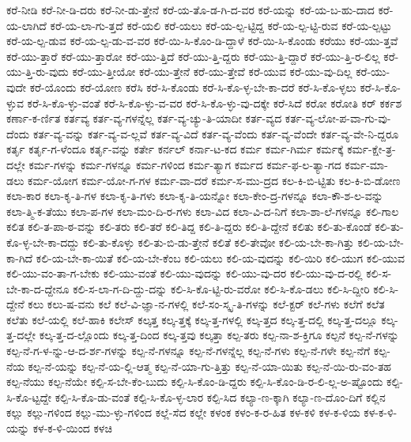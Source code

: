 {ಕರೆ-ನೀಡಿ
ಕರೆ-ನೀ-ಡಿ-ದರು
ಕರೆ-ನೀ-ಡು-ತ್ತೇನೆ
ಕರೆ-ಯ-ತೊ-ಡ-ಗಿ-ದ-ವರ
ಕರೆ-ಯನ್ನು
ಕರೆ-ಯ-ಬ-ಹು-ದಾದ
ಕರೆ-ಯ-ಲಾಗಿದೆ
ಕರೆ-ಯ-ಲಾ-ಗು-ತ್ತದೆ
ಕರೆ-ಯಲಿ
ಕರೆ-ಯಲು
ಕರೆ-ಯ-ಲ್ಪ-ಟ್ಟಿದ್ದ
ಕರೆ-ಯ-ಲ್ಪ-ಟ್ಟಿ-ರುವ
ಕರೆ-ಯ-ಲ್ಪಟ್ಟು
ಕರೆ-ಯ-ಲ್ಪ-ಡುವ
ಕರೆ-ಯ-ಲ್ಪ-ಡು-ವ-ವರ
ಕರೆ-ಯಿ-ಸಿ-ಕೊಂ-ಡಿ-ದ್ದಾಳೆ
ಕರೆ-ಯಿ-ಸಿ-ಕೊಂಡು
ಕರೆಯು
ಕರೆ-ಯು-ತ್ತವೆ
ಕರೆ-ಯು-ತ್ತಾರೆ
ಕರೆ-ಯು-ತ್ತಾರೋ
ಕರೆ-ಯು-ತ್ತಿದೆ
ಕರೆ-ಯು-ತ್ತಿ-ದ್ದರು
ಕರೆ-ಯು-ತ್ತಿ-ದ್ದಾರೆ
ಕರೆ-ಯು-ತ್ತಿ-ರ-ಲಿಲ್ಲ
ಕರೆ-ಯು-ತ್ತಿ-ರು-ವುದು
ಕರೆ-ಯು-ತ್ತೀಯೋ
ಕರೆ-ಯು-ತ್ತೇನೆ
ಕರೆ-ಯು-ತ್ತೇವೆ
ಕರೆ-ಯುವ
ಕರೆ-ಯು-ವು-ದಿಲ್ಲ
ಕರೆ-ಯು-ವುದೇ
ಕರೆ-ಯೊಂದು
ಕರೆ-ಯೋಣ
ಕರೆಸಿ
ಕರೆ-ಸಿ-ಕೊಂಡು
ಕರೆ-ಸಿ-ಕೊ-ಳ್ಳ-ಬೇ-ಕಾ-ದರೆ
ಕರೆ-ಸಿ-ಕೊ-ಳ್ಳಲು
ಕರೆ-ಸಿ-ಕೊ-ಳ್ಳುವ
ಕರೆ-ಸಿ-ಕೊ-ಳ್ಳು-ವಂತೆ
ಕರೆ-ಸಿ-ಕೊ-ಳ್ಳು-ವ-ವರ
ಕರೆ-ಸಿ-ಕೊ-ಳ್ಳು-ವು-ದಕ್ಕೇ
ಕರೆ-ಸಿದೆ
ಕರೋ
ಕರೋತಿ
ಕರ್
ಕರ್ಕಶ
ಕರ್ಣಾ-ಕ-ರ್ಣಿತ
ಕರ್ತವ್ಯ
ಕರ್ತ-ವ್ಯ-ಗಳನ್ನೆಲ್ಲ
ಕರ್ತ-ವ್ಯ-ಚ್ಯು-ತಿ-ಯಾದೀ
ಕರ್ತ-ವ್ಯದ
ಕರ್ತ-ವ್ಯ-ಲೋ-ಪ-ವಾ-ಗು-ವು-ದೆಂದು
ಕರ್ತ-ವ್ಯ-ವನ್ನು
ಕರ್ತ-ವ್ಯ-ವ-ಲ್ಲವೆ
ಕರ್ತ-ವ್ಯ-ವಿದೆ
ಕರ್ತ-ವ್ಯ-ವೆಂದು
ಕರ್ತ-ವ್ಯ-ವೆಂದೇ
ಕರ್ತ-ವ್ಯ-ವೇ-ನಿ-ದ್ದರೂ
ಕರ್ತೃ
ಕರ್ತೃ-ಗ-ಳೆಂದೂ
ಕರ್ತೃ-ವನ್ನು
ಕರ್ತೇ
ಕರ್ನಲ್
ಕರ್ನಾ-ಟ-ಕದ
ಕರ್ಮ
ಕರ್ಮ-ಗಿರ್ಮ
ಕರ್ಮಕ್ಕೆ
ಕರ್ಮ-ಕ್ಷೇ-ತ್ರ-ದಲ್ಲೇ
ಕರ್ಮ-ಗಳನ್ನು
ಕರ್ಮ-ಗಳನ್ನೂ
ಕರ್ಮ-ಗಳಿಂದ
ಕರ್ಮ-ತ್ಯಾಗ
ಕರ್ಮದ
ಕರ್ಮ-ಫ-ಲ-ತ್ಯಾ-ಗದ
ಕರ್ಮ-ಮಾ-ಡಲು
ಕರ್ಮ-ಯೋಗ
ಕರ್ಮ-ಯೋ-ಗ-ಗಳ
ಕರ್ಮ-ವಾ-ದರೆ
ಕರ್ಮ-ಸ-ಮು-ದ್ರದ
ಕಲ-ಕಿ-ಬಿ-ಟ್ಟಿತು
ಕಲ-ಕಿ-ಬಿ-ಡೋಣ
ಕಲಾ-ಕಾರ
ಕಲಾ-ಕೃ-ತಿ-ಗಳ
ಕಲಾ-ಕೃ-ತಿ-ಗಳು
ಕಲಾ-ಕೃ-ತಿ-ಯನ್ನೋ
ಕಲಾ-ಕೇಂ-ದ್ರ-ಗಳನ್ನೂ
ಕಲಾ-ಕೌ-ಶ-ಲ-ವನ್ನು
ಕಲಾ-ತ್ಮಿ-ಕ-ತೆಯು
ಕಲಾ-ಪ-ಗಳ
ಕಲಾ-ಮಂ-ದಿ-ರ-ಗಳು
ಕಲಾ-ವಿದ
ಕಲಾ-ವಿ-ದ-ನಿಗೆ
ಕಲಾ-ಶಾ-ಲೆ-ಗಳನ್ನೂ
ಕಲಿ-ಗಾಲ
ಕಲಿತ
ಕಲಿ-ತ-ಪಾ-ಠ-ವನ್ನು
ಕಲಿ-ತರು
ಕಲಿ-ತರೆ
ಕಲಿ-ತಿದ್ದ
ಕಲಿ-ತಿ-ದ್ದರು
ಕಲಿ-ತಿ-ದ್ದೇನೆ
ಕಲಿತು
ಕಲಿ-ತು-ಕೊಂಡೆ
ಕಲಿ-ತು-ಕೊ-ಳ್ಳ-ಬೇ-ಕಾ-ದದ್ದು
ಕಲಿ-ತು-ಕೊಳ್ಳು
ಕಲಿ-ತು-ಬಿ-ಡು-ತ್ತೇನೆ
ಕಲಿತೆ
ಕಲಿ-ತೇವೋ
ಕಲಿ-ಯ-ಬೇ-ಕಾ-ಗಿತ್ತು
ಕಲಿ-ಯ-ಬೇ-ಕಾ-ಗಿದೆ
ಕಲಿ-ಯ-ಬೇ-ಕಾ-ಯಿತೆ
ಕಲಿ-ಯ-ಬೇ-ಕೆಂಬ
ಕಲಿ-ಯಲು
ಕಲಿ-ಯ-ವುದನ್ನು
ಕಲಿ-ಯಿರಿ
ಕಲಿ-ಯುಗ
ಕಲಿ-ಯುವ
ಕಲಿ-ಯು-ವಂ-ತಾ-ಗ-ಬೇಕು
ಕಲಿ-ಯು-ವಂತೆ
ಕಲಿ-ಯು-ವುದನ್ನು
ಕಲಿ-ಯು-ವು-ದರ
ಕಲಿ-ಯು-ವು-ದ-ರಲ್ಲಿ
ಕಲಿ-ಸ-ಬೇ-ಕಾ-ದ-ದ್ದೇನೂ
ಕಲಿ-ಸ-ಲಾ-ಗ-ದಿ-ದ್ದು-ದನ್ನು
ಕಲಿ-ಸಿ-ಕೊ-ಟ್ಟಿ-ರು-ವರೋ
ಕಲಿ-ಸಿ-ಕೊ-ಡಲು
ಕಲಿ-ಸಿ-ದ್ದೀರಿ
ಕಲಿ-ಸಿ-ದ್ದೇನೆ
ಕಲು
ಕಲು-ಷ-ವನು
ಕಲೆ
ಕಲೆ-ವಿ-ಜ್ಞಾ-ನ-ಗಳಲ್ಲಿ
ಕಲೆ-ಸಂ-ಸ್ಕೃ-ತಿ-ಗಳನ್ನು
ಕಲೆ-ಕ್ಟರ್
ಕಲೆ-ಗಳು
ಕಲೆಗೆ
ಕಲೆತ
ಕಲೆತು
ಕಲೆ-ಯಲ್ಲಿ
ಕಲೆ-ಹಾಕಿ
ಕಲೇಸ್
ಕಲ್ಕತ್ತ
ಕಲ್ಕ-ತ್ತಕ್ಕೆ
ಕಲ್ಕ-ತ್ತ-ಗಳಲ್ಲಿ
ಕಲ್ಕ-ತ್ತದ
ಕಲ್ಕ-ತ್ತ-ದಲ್ಲಿ
ಕಲ್ಕ-ತ್ತ-ದಲ್ಲೂ
ಕಲ್ಕ-ತ್ತ-ದಲ್ಲೇ
ಕಲ್ಕ-ತ್ತ-ದ-ಲ್ಲೊಂದು
ಕಲ್ಕ-ತ್ತ-ದಿಂದ
ಕಲ್ಕ-ತ್ತವು
ಕಲ್ಕತ್ತಾ
ಕಲ್ಪ-ತರು
ಕಲ್ಪ-ನಾ-ಶ-ಕ್ತಿಗೂ
ಕಲ್ಪನೆ
ಕಲ್ಪ-ನೆ-ಗಳನ್ನು
ಕಲ್ಪ-ನೆ-ಗ-ಳ-ನ್ನು-ಆ-ದ-ರ್ಶ-ಗಳನ್ನು
ಕಲ್ಪ-ನೆ-ಗಳನ್ನೂ
ಕಲ್ಪ-ನೆ-ಗಳನ್ನೆಲ್ಲ
ಕಲ್ಪ-ನೆ-ಗಳು
ಕಲ್ಪ-ನೆ-ಗಳೇ
ಕಲ್ಪ-ನೆಗೆ
ಕಲ್ಪ-ನೆಯ
ಕಲ್ಪ-ನೆ-ಯನ್ನು
ಕಲ್ಪ-ನೆ-ಯ-ಲ್ಲಿ-ಆತ್ಮ
ಕಲ್ಪ-ನೆ-ಯಾ-ಗು-ತ್ತಿತ್ತು
ಕಲ್ಪ-ನೆ-ಯಾ-ಯಿತು
ಕಲ್ಪ-ನೆ-ಯಿ-ರು-ವಂ-ತಹ
ಕಲ್ಪ-ನೆಯು
ಕಲ್ಪ-ನೆಯೇ
ಕಲ್ಪಿ-ಸ-ಬೇ-ಕೆಂ-ಬುದು
ಕಲ್ಪಿ-ಸಿ-ಕೊಂ-ಡಿ-ದ್ದರು
ಕಲ್ಪಿ-ಸಿ-ಕೊಂ-ಡಿ-ರ-ಲಿ-ಲ್ಲ-ಅ-ಷ್ಟೊಂದು
ಕಲ್ಪಿ-ಸಿ-ಕೊ-ಟ್ಟದ್ದೇ
ಕಲ್ಪಿ-ಸಿ-ಕೊ-ಡು-ವಂತೆ
ಕಲ್ಪಿ-ಸಿ-ಕೊ-ಳ್ಳ-ಲಾರ
ಕಲ್ಪಿ-ಸಿದ
ಕಲ್ಯಾ-ಣ-ಕ್ಕಾಗಿ
ಕಲ್ಯಾ-ಣ-ದೊಂ-ದಿಗೆ
ಕಲ್ಲಿನ
ಕಲ್ಲು
ಕಲ್ಲು-ಗಳಿಂದ
ಕಲ್ಲು-ಮು-ಳ್ಳು-ಗಳಿಂದ
ಕಲ್ಲೆ-ಸೆದ
ಕಲ್ಲೇ
ಕಳಂಕ
ಕಳಂ-ಕ-ರ-ಹಿತ
ಕಳ-ಕಳಿ
ಕಳ-ಕ-ಳಿಯ
ಕಳ-ಕ-ಳಿ-ಯನ್ನು
ಕಳ-ಕ-ಳಿ-ಯಿಂದ
ಕಳಚಿ
}
